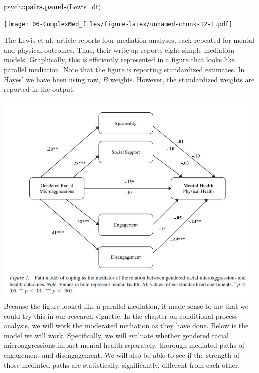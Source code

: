 \documentclass[
  11pt,
]{book}
\newenvironment{Shaded}{\begin{snugshade}}{\end{snugshade}}
\newcommand{\FunctionTok}[1]{\textcolor[rgb]{0.27,0.27,0.27}{\textbf{#1}}}
\newcommand{\NormalTok}[1]{#1}
\newcommand{\SpecialCharTok}[1]{\textcolor[rgb]{0.43,0.43,0.43}{\textbf{#1}}}
\begin{document}
\begin{Shaded}
\begin{Highlighting}[]
\NormalTok{psych}\SpecialCharTok{::}\FunctionTok{pairs.panels}\NormalTok{(Lewis\_df)}
\end{Highlighting}
\end{Shaded}

\texttt{[image: 06-ComplexMed\_files/figure-latex/unnamed-chunk-12-1.pdf]}

The Lewis et al.~article \citeyearpar{lewis_applying_2017} reports four mediation analyses, each repeated for mental and physical outcomes. Thus, their write-up reports eight simple mediation models. Graphically, this is efficiently represented in a figure that looks like parallel mediation. Note that the figure is reporting standardized estimates. In Hayes' \citeyearpar{hayes_introduction_2018} we have been using raw, \(B\) weights. However, the standardized weights are reported in the output.

\includegraphics{images/CompMed/LewisMedFig.jpg} Because the figure looked like a parallel mediation, it made sense to me that we could try this in our research vignette. In the chapter on conditional process analysis, we will work the moderated mediation as they have done. Below is the model we will work. Specifically, we will evaluate whether gendered racial microaggressions impact mental health separately, thorough mediated paths of engagement and disengagement. We will also be able to see if the strength of those mediated paths are statistically, significantly, different from each other.
\end{document}
